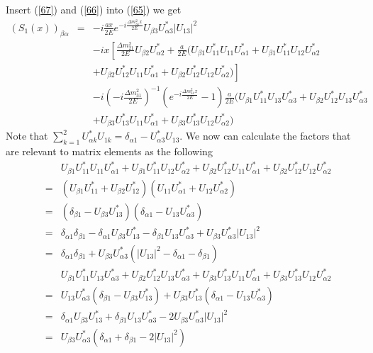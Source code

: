 \documentclass[a4 paper,12pt]{report}%
\begin{document}
Insert (\ref{67}) and (\ref{66}) into (\ref{65}) we get
 \begin{eqnarray}\nonumber
(S_1(x))_{\beta\alpha} &=& -i\frac{ax}{2E}e^{-i\frac{\Delta m^2_{31}x}{2E}}U_{\beta 3}U^*_{\alpha 3}|U_{13}|^2\\ \nonumber
&&-ix\left[\frac{\Delta m^2_{21}}{2E}U_{\beta 2}U^*_{\alpha 2}+ \frac{a}{2E}(U_{\beta 1}U^*_{11}U_{11}U^*_{\alpha 1}+U_{\beta 1}U^*_{11}U_{12}U^*_{\alpha 2}\right.\\ \nonumber
&&\left.+U_{\beta 2}U^*_{12}U_{11}U^*_{\alpha 1} +U_{\beta 2}U^*_{12}U_{12}U^*_{\alpha 2})\right]\\ \nonumber
&&-i\left(-i\frac{\Delta m^2_{31}}{2E}\right)^{-1}\left(e^{-i\frac{\Delta m^2_{31}x}{2E}}-1\right)\frac{a}{2E}(U_{\beta 1}U^*_{11}U_{13}U^*_{\alpha 3}+U_{\beta 2}U^*_{12}U_{13}U^*_{\alpha 3} \\ \nonumber
&&+U_{\beta 3}U^*_{13}U_{11}U^*_{\alpha 1} +U_{\beta 3}U^*_{13}U_{12}U^*_{\alpha 2})
\end{eqnarray}
Note that $\sum^2_{k=1}U^*_{\alpha k}U_{1k} = \delta_{\alpha 1}-U^*_{\alpha 3}U_{13}$. We now can calculate the factors that are relevant to matrix elements as the following
 \begin{eqnarray}\nonumber
&&U_{\beta 1}U^*_{11}U_{11}U^*_{\alpha 1}+U_{\beta 1}U^*_{11}U_{12}U^*_{\alpha 2}+U_{\beta 2}U^*_{12}U_{11}U^*_{\alpha 1}+U_{\beta 2}U^*_{12}U_{12}U^*_{\alpha 2}\\ \nonumber
&=&(U_{\beta 1}U^*_{11}+U_{\beta 2}U^*_{12})(U_{11}U^*_{\alpha 1}+U_{12}U^*_{\alpha 2})\\ \nonumber
&=&(\delta_{\beta 1}-U_{\beta 3}U^*_{13})(\delta_{\alpha 1}-U_{13}U^*_{\alpha 3})\\ \nonumber
&=& \delta_{\alpha 1}\delta_{\beta 1}-\delta_{\alpha 1}U_{\beta 3}U^*_{13}-\delta_{\beta 1}U_{13}U^*_{\alpha 3}+U_{\beta 3}U^*_{\alpha 3}|U_{13}|^2\\ \nonumber
&=&\delta_{\alpha 1}\delta_{\beta 1}+U_{\beta 3}U^*_{\alpha 3}(|U_{13}|^2-\delta_{\alpha 1}-\delta_{\beta 1})
\end{eqnarray}
 \begin{eqnarray}\nonumber
 &&U_{\beta 1}U^*_{11}U_{13}U^*_{\alpha 3}+U_{\beta 2}U^*_{12}U_{13}U^*_{\alpha 3}+U_{\beta 3}U^*_{13}U_{11}U^*_{\alpha 1}+U_{\beta 3}U^*_{13}U_{12}U^*_{\alpha 2}\\ \nonumber
&=&U_{13}U^*_{\alpha 3}(\delta_{\beta 1}-U_{\beta 3}U^*_{13})+ U_{\beta 3}U^*_{13}(\delta_{\alpha 1} -U_{13}U^*_{\alpha 3})\\ \nonumber
&=& \delta_{\alpha 1}U_{\beta 3}U^*_{13}+\delta_{\beta 1}U_{13}U^*_{\alpha 3} -2U_{\beta 3}U^*_{\alpha 3}|U_{13}|^2\\ \nonumber
&=&U_{\beta 3}U^*_{\alpha 3}(\delta_{\alpha 1}+\delta_{\beta 1}-2|U_{13}|^2)
\end{eqnarray}
\end{document}
